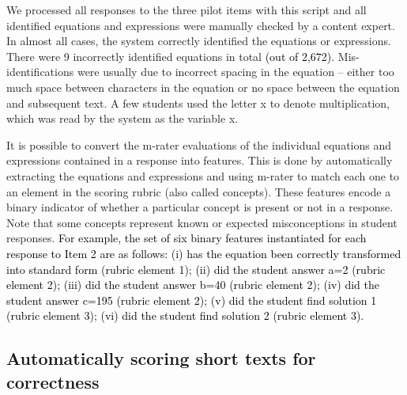 \documentclass[11pt,a4paper]{article}
\newcommand{\AC}{\textcolor{black}} %
\begin{document}
We processed all responses to the three pilot items with this script and all identified equations and expressions were manually checked by a content expert. In almost all cases, the system correctly identified the equations or expressions. There were 9 incorrectly identified equations in total \AC{(out of 2,672)}. Mis-identifications were usually due to incorrect spacing in the equation -- either too much space between characters in the equation or no space between the equation and subsequent text. A few students used the letter x to denote multiplication, which was read by the system as the variable x.

It is possible to convert the m-rater evaluations of the individual equations and expressions contained in a response into features. This is done by automatically extracting the equations and expressions and using m-rater to match each one to an element in the scoring rubric (also called concepts). These features encode a binary indicator of whether a particular concept is present or not in a response. Note that some concepts represent known or expected misconceptions in student responses. \AC{For example, the set of six binary features instantiated for each response to Item 2 are as follows: (i) has the equation been correctly transformed into standard form (rubric element 1); (ii) did the student answer a=2 (rubric element 2); (iii) did the student answer b=40 (rubric element 2); (iv) did the student answer c=195 (rubric element 2); (v) did the student find solution 1 (rubric element 3); (vi) did the student find solution 2 (rubric element 3).}

\subsection{Automatically scoring short texts for correctness}
\label{subsection:scoring}
\end{document}

